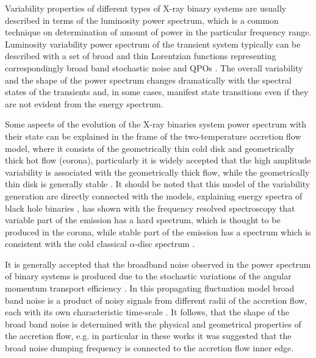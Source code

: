 \documentclass[a4paper,fleqn,usenatbib]{mnras}
\begin{document}
    Variability properties of different types of X-ray binary systems are usually described in terms of the luminosity power spectrum, which is a common technique on determination of amount of power in the particular frequency range.
    Luminosity variability power spectrum of the transient system typically can be described with a set of broad and thin Lorentzian functions representing correspondingly broad band stochastic noise and QPOs \citep[see, e.g.][]{1972ApJ...174L..35T, 1990A&A...227L..33B}.
    The overall variability and the shape of the power spectrum changes dramatically with the spectral states of the transients and, in some cases, manifest state transitions even if they are not evident from the energy spectrum.

    Some aspects of the evolution of the X-ray binaries system power spectrum with their state can be explained in the frame of the two-temperature accretion flow model, where it consists of the geometrically thin cold disk and geometrically thick hot flow (corona), particularly it is widely accepted that the high amplitude variability is associated with the geometrically thick flow, while the geometrically thin disk is generally stable \citep{2001MNRAS.321..759C}. 
It should be noted that this model of the variability generation are directly connected with the models, explaining energy spectra of black hole binaries \citep[see, e.g.,][]{1975ApJ...199L.153E, 1976ApJ...204..187S, 1995ApJ...452..710N}, \citet{2001MNRAS.321..759C} has shown with the frequency resolved spectroscopy that variable part of the emission has a hard spectrum, which is thought to be produced in the corona, while stable part of the emission has a spectrum which is consistent with the cold classical $\alpha$-disc spectrum \citep{ss73}.

    It is generally accepted that the broadband noise observed in the power spectrum of binary systems is produced due to the stochastic variations of the angular momentum transport efficiency \citep{1997MNRAS.292..679L}. 
    In this propagating fluctuation model broad band noise is a product of noisy signals from different radii of the accretion flow, each with its own characteristic time-scale \citep[see, e.g.][]{2006MNRAS.367..801A, 2013MNRAS.434.1476I}.
    It follows, that the shape of the broad band noise is determined with the physical and geometrical properties of the accretion flow, e.g. in particular in these works it was suggested that the broad noise dumping frequency is connected to the accretion flow inner edge.
\end{document}
